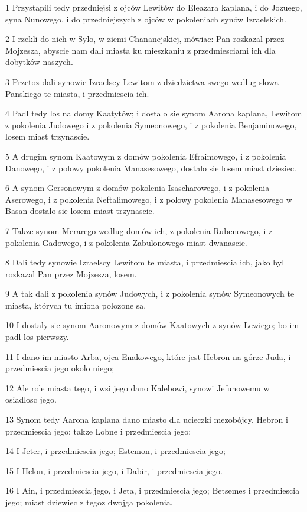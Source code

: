 \par 1 Przystapili tedy przedniejsi z ojców Lewitów do Eleazara kaplana, i do Jozuego, syna Nunowego, i do przedniejszych z ojców w pokoleniach synów Izraelskich.
\par 2 I rzekli do nich w Sylo, w ziemi Chananejskiej, mówiac: Pan rozkazal przez Mojzesza, abyscie nam dali miasta ku mieszkaniu z przedmiesciami ich dla dobytków naszych.
\par 3 Przetoz dali synowie Izraelscy Lewitom z dziedzictwa swego wedlug slowa Panskiego te miasta, i przedmiescia ich.
\par 4 Padl tedy los na domy Kaatytów; i dostalo sie synom Aarona kaplana, Lewitom z pokolenia Judowego i z pokolenia Symeonowego, i z pokolenia Benjaminowego, losem miast trzynascie.
\par 5 A drugim synom Kaatowym z domów pokolenia Efraimowego, i z pokolenia Danowego, i z polowy pokolenia Manasesowego, dostalo sie losem miast dziesiec.
\par 6 A synom Gersonowym z domów pokolenia Isascharowego, i z pokolenia Aserowego, i z pokolenia Neftalimowego, i z polowy pokolenia Manasesowego w Basan dostalo sie losem miast trzynascie.
\par 7 Takze synom Merarego wedlug domów ich, z pokolenia Rubenowego, i z pokolenia Gadowego, i z pokolenia Zabulonowego miast dwanascie.
\par 8 Dali tedy synowie Izraelscy Lewitom te miasta, i przedmiescia ich, jako byl rozkazal Pan przez Mojzesza, losem.
\par 9 A tak dali z pokolenia synów Judowych, i z pokolenia synów Symeonowych te miasta, których tu imiona polozone sa.
\par 10 I dostaly sie synom Aaronowym z domów Kaatowych z synów Lewiego; bo im padl los pierwszy.
\par 11 I dano im miasto Arba, ojca Enakowego, które jest Hebron na górze Juda, i przedmiescia jego okolo niego;
\par 12 Ale role miasta tego, i wsi jego dano Kalebowi, synowi Jefunowemu w osiadlosc jego.
\par 13 Synom tedy Aarona kaplana dano miasto dla ucieczki mezobójcy, Hebron i przedmiescia jego; takze Lobne i przedmiescia jego;
\par 14 I Jeter, i przedmiescia jego; Estemon, i przedmiescia jego;
\par 15 I Helon, i przedmiescia jego, i Dabir, i przedmiescia jego.
\par 16 I Ain, i przedmiescia jego, i Jeta, i przedmiescia jego; Betsemes i przedmiescia jego; miast dziewiec z tegoz dwojga pokolenia.
